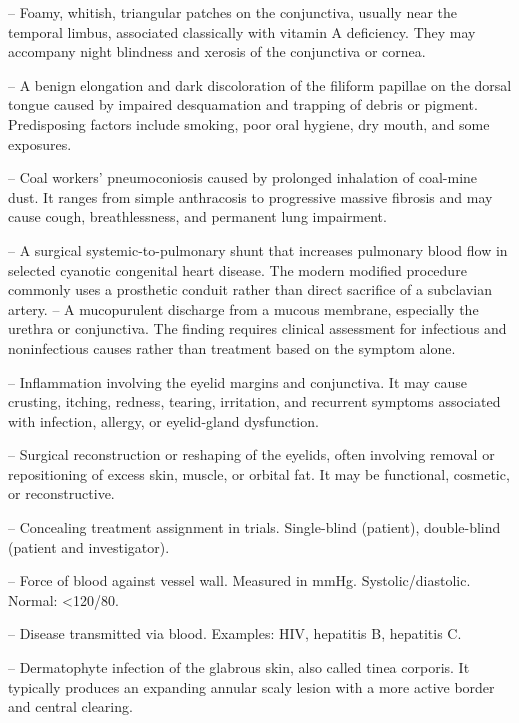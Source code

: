 -- Foamy, whitish, triangular patches on the conjunctiva, usually near the temporal limbus, associated classically with vitamin A deficiency. They may accompany night blindness and xerosis of the conjunctiva or cornea.

-- A benign elongation and dark discoloration of the filiform papillae on the dorsal tongue caused by impaired desquamation and trapping of debris or pigment. Predisposing factors include smoking, poor oral hygiene, dry mouth, and some exposures.

-- Coal workers' pneumoconiosis caused by prolonged inhalation of coal-mine dust. It ranges from simple anthracosis to progressive massive fibrosis and may cause cough, breathlessness, and permanent lung impairment.

-- A surgical systemic-to-pulmonary shunt that increases pulmonary blood flow in selected cyanotic congenital heart disease. The modern modified procedure commonly uses a prosthetic conduit rather than direct sacrifice of a subclavian artery.
-- A mucopurulent discharge from a mucous membrane, especially the urethra or conjunctiva. The finding requires clinical assessment for infectious and noninfectious causes rather than treatment based on the symptom alone.


-- Inflammation involving the eyelid margins and conjunctiva. It may cause crusting, itching, redness, tearing, irritation, and recurrent symptoms associated with infection, allergy, or eyelid-gland dysfunction.

-- Surgical reconstruction or reshaping of the eyelids, often involving removal or repositioning of excess skin, muscle, or orbital fat. It may be functional, cosmetic, or reconstructive.

-- Concealing treatment assignment in trials. Single-blind (patient), double-blind (patient and investigator).

-- Force of blood against vessel wall. Measured in mmHg. Systolic/diastolic. Normal: <120/80.


-- Disease transmitted via blood. Examples: HIV, hepatitis B, hepatitis C.



-- Dermatophyte infection of the glabrous skin, also called tinea corporis. It typically produces an expanding annular scaly lesion with a more active border and central clearing.

